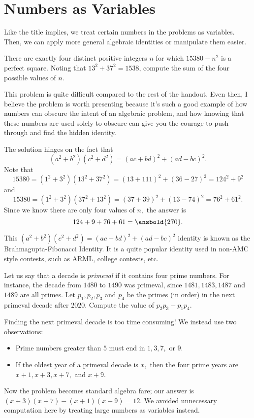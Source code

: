 \documentclass{article}
\begin{document}
\section{Numbers as Variables}
Like the title implies, we treat certain numbers in the problems as variables. Then, we can apply more general algebraic identities or manipulate them easier.
\begin{exam}[SMT 2021/N5]
There are exactly four distinct positive integers $n$ for which $15380 - n^2$ is a perfect square. Noting that $13^2 + 37^2 = 1538$, compute the sum of the four possible values of $n$.
\end{exam}

This problem is quite difficult compared to the rest of the handout. Even then, I believe the problem is worth presenting because it's such a good example of how numbers can obscure the intent of an algebraic problem, and how knowing that these numbers are used solely to obscure can give you the courage to push through and find the hidden identity.

\begin{sol}
The solution hinges on the fact that
\[(a^2+b^2)(c^2+d^2)=(ac+bd)^2+(ad-bc)^2.\]
Note that
\[15380=(1^2+3^2)(13^2+37^2)=(13+111)^2+(36-27)^2=124^2+9^2\]
and
\[15380=(1^2+3^2)(37^2+13^2)=(37+39)^2+(13-74)^2=76^2+61^2.\]
Since we know there are only four values of $n,$ the answer is
\[124+9+76+61=\ansbold{270}.\]
\end{sol}

This $(a^2+b^2)(c^2+d^2)=(ac+bd)^2+(ad-bc)^2$ identity is known as the Brahmagupta-Fibonacci Identity. It is a quite popular identity used in non-AMC style contests, such as ARML, college contests, etc.

\begin{exam}[2017-2018 Mandelbrot]
Let us say that a decade is \emph{primeval} if it contains four prime numbers. For instance, the decade from $1480$ to $1490$ was primeval, since $1481, 1483, 1487$ and $1489$ are all primes. Let $p_1,p _2, p_3$ and $p_4$ be the primes (in order) in the  next primeval decade after $2020.$ Compute the value of $p_2 p_3-p_1 p_4$.
\end{exam}

\begin{sol}
Finding the next primeval decade is too time consuming! We instead use two observations:
\begin{itemize}
\item Prime numbers greater than $5$ must end in $1,3,7,$ or $9.$
\item If the oldest year of a primeval decade is $x,$ then the four prime years are $x+1,x+3,x+7,$ and $x+9.$
\end{itemize}
Now the problem becomes standard algebra fare; our answer is $(x+3)(x+7)-(x+1)(x+9) = 12.$ We avoided unnecessary computation here by treating large numbers as variables instead.
\end{sol}
\end{document}
